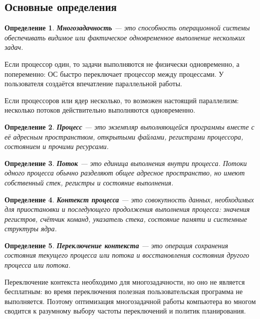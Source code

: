 \documentclass[12pt,a4paper]{article}
\newtheorem{definition}{Определение}
\begin{document}
\subsection{Основные определения}

\begin{definition}
\textbf{Многозадачность} --- это способность операционной системы обеспечивать видимое или фактическое одновременное выполнение нескольких задач.
\end{definition}

Если процессор один, то задачи выполняются не физически одновременно, а попеременно: ОС быстро переключает процессор между процессами. У пользователя создаётся впечатление параллельной работы.

Если процессоров или ядер несколько, то возможен настоящий параллелизм: несколько потоков действительно выполняются одновременно.

\begin{definition}
\textbf{Процесс} --- это экземпляр выполняющейся программы вместе с её адресным пространством, открытыми файлами, регистрами процессора, состоянием и прочими ресурсами.
\end{definition}

\begin{definition}
\textbf{Поток} --- это единица выполнения внутри процесса. Потоки одного процесса обычно разделяют общее адресное пространство, но имеют собственный стек, регистры и состояние выполнения.
\end{definition}

\begin{definition}
\textbf{Контекст процесса} --- это совокупность данных, необходимых для приостановки и последующего продолжения выполнения процесса: значения регистров, счётчик команд, указатель стека, состояние памяти и системные структуры ядра.
\end{definition}

\begin{definition}
\textbf{Переключение контекста} --- это операция сохранения состояния текущего процесса или потока и восстановления состояния другого процесса или потока.
\end{definition}

Переключение контекста необходимо для многозадачности, но оно не является бесплатным: во время переключения полезная пользовательская программа не выполняется. Поэтому оптимизация многозадачной работы компьютера во многом сводится к разумному выбору частоты переключений и политик планирования.
\end{document}
